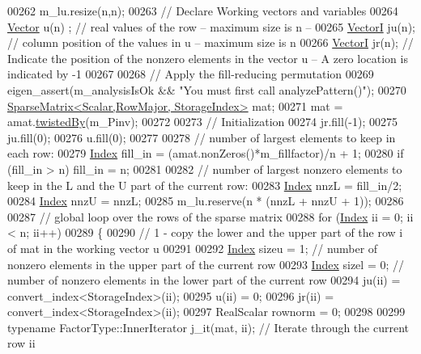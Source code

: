 \begin{DoxyCode}
00262   m\_lu.resize(n,n);
00263   \textcolor{comment}{// Declare Working vectors and variables}
00264   \hyperlink{group___core___module}{Vector} u(n) ;     \textcolor{comment}{// real values of the row -- maximum size is n --}
00265   \hyperlink{group___core___module}{VectorI} ju(n);   \textcolor{comment}{// column position of the values in u -- maximum size  is n}
00266   \hyperlink{group___core___module}{VectorI} jr(n);   \textcolor{comment}{// Indicate the position of the nonzero elements in the vector u -- A zero
       location is indicated by -1}
00267 
00268   \textcolor{comment}{// Apply the fill-reducing permutation}
00269   eigen\_assert(m\_analysisIsOk && \textcolor{stringliteral}{"You must first call analyzePattern()"});
00270   \hyperlink{group___sparse_core___module}{SparseMatrix<Scalar,RowMajor, StorageIndex>} mat;
00271   mat = amat.\hyperlink{group___sparse_core___module_a51d4898bd6a57cc3ba543a39b102423e}{twistedBy}(m\_Pinv);
00272 
00273   \textcolor{comment}{// Initialization}
00274   jr.fill(-1);
00275   ju.fill(0);
00276   u.fill(0);
00277 
00278   \textcolor{comment}{// number of largest elements to keep in each row:}
00279   \hyperlink{namespace_eigen_a62e77e0933482dafde8fe197d9a2cfde}{Index} fill\_in = (amat.nonZeros()*m\_fillfactor)/n + 1;
00280   \textcolor{keywordflow}{if} (fill\_in > n) fill\_in = n;
00281 
00282   \textcolor{comment}{// number of largest nonzero elements to keep in the L and the U part of the current row:}
00283   \hyperlink{namespace_eigen_a62e77e0933482dafde8fe197d9a2cfde}{Index} nnzL = fill\_in/2;
00284   \hyperlink{namespace_eigen_a62e77e0933482dafde8fe197d9a2cfde}{Index} nnzU = nnzL;
00285   m\_lu.reserve(n * (nnzL + nnzU + 1));
00286 
00287   \textcolor{comment}{// global loop over the rows of the sparse matrix}
00288   \textcolor{keywordflow}{for} (\hyperlink{namespace_eigen_a62e77e0933482dafde8fe197d9a2cfde}{Index} ii = 0; ii < n; ii++)
00289   \{
00290     \textcolor{comment}{// 1 - copy the lower and the upper part of the row i of mat in the working vector u}
00291 
00292     \hyperlink{namespace_eigen_a62e77e0933482dafde8fe197d9a2cfde}{Index} sizeu = 1; \textcolor{comment}{// number of nonzero elements in the upper part of the current row}
00293     \hyperlink{namespace_eigen_a62e77e0933482dafde8fe197d9a2cfde}{Index} sizel = 0; \textcolor{comment}{// number of nonzero elements in the lower part of the current row}
00294     ju(ii)    = convert\_index<StorageIndex>(ii);
00295     u(ii)     = 0;
00296     jr(ii)    = convert\_index<StorageIndex>(ii);
00297     RealScalar rownorm = 0;
00298 
00299     \textcolor{keyword}{typename} FactorType::InnerIterator j\_it(mat, ii); \textcolor{comment}{// Iterate through the current row ii}

\end{DoxyCode}
